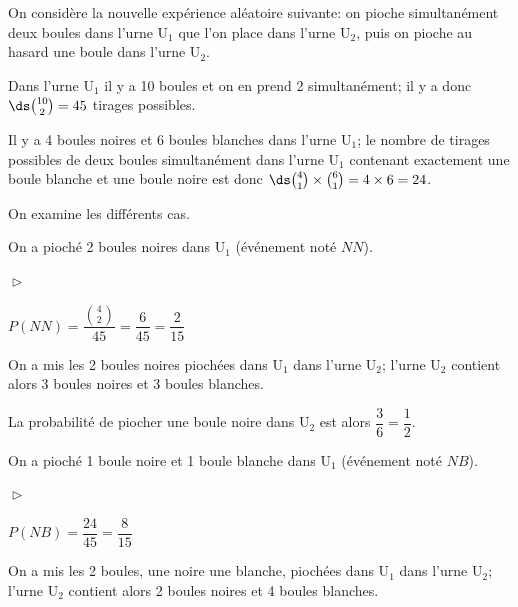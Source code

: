 \smallskip

On considère la nouvelle expérience aléatoire suivante: on pioche simultanément deux boules dans l'urne U$_1$ que l'on place dans l'urne U$_2$, puis on pioche au hasard une boule dans l'urne U$_2$.

\medskip

\begin{enumerate}
\item%
Dans l'urne U$_1$ il y a 10 boules et on en prend 2 simultanément; il y a donc $\ds\binom{10}{2}=45$ tirages possibles.

\item%
Il y a 4 boules noires et 6 boules blanches dans l'urne U$_1$; le nombre de tirages possibles de deux boules simultanément dans l'urne U$_1$ contenant exactement une boule blanche et une boule noire est donc $\ds\binom{4}{1}\times \binom{6}{1} = 4\times 6 = 24$.

\item %
\begin{list}{\textbullet}{On examine les différents cas.}
\item On a pioché 2 boules noires dans U$_1$ (événement noté $NN$).

\begin{list}{$\vartriangleright$}{}
\item $P\left (NN\right ) = \dfrac{\binom{4}{2}}{45} = \dfrac{6}{45}=\dfrac{2}{15}$
\item On a mis les 2 boules noires piochées dans U$_1$ dans l'urne U$_2$; l'urne U$_2$ contient alors 3 boules noires et 3 boules blanches. 

La probabilité de piocher une boule noire dans U$_2$ est alors $\dfrac{3}{6}=\dfrac{1}{2}$.
\end{list}

\item On a pioché 1 boule noire et 1 boule blanche dans U$_1$ (événement noté $NB$).

\begin{list}{$\vartriangleright$}{}
\item $P\left (NB\right ) = \dfrac{24}{45} =\dfrac{8}{15}$
\item On a mis les 2 boules,  une noire une blanche, piochées dans U$_1$ dans l'urne U$_2$; l'urne U$_2$ contient alors 2 boules noires et 4 boules blanches. 


\end{list}
\end{list}
\end{enumerate}
